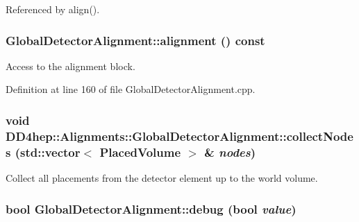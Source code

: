 Referenced by align().\hypertarget{class_d_d4hep_1_1_alignments_1_1_global_detector_alignment_a4c86dcdecf0985adee4f709f0db5a9e9}{
\subsubsection[{alignment}]{ GlobalDetectorAlignment::alignment () const}}
\label{class_d_d4hep_1_1_alignments_1_1_global_detector_alignment_a4c86dcdecf0985adee4f709f0db5a9e9}


Access to the alignment block. 

Definition at line 160 of file GlobalDetectorAlignment.cpp.\hypertarget{class_d_d4hep_1_1_alignments_1_1_global_detector_alignment_a05789b13a179780a57c759a573fdfe85}{
\subsubsection[{collectNodes}]{\setlength{\rightskip}{0pt plus 5cm}void DD4hep::Alignments::GlobalDetectorAlignment::collectNodes (std::vector$<$ PlacedVolume $>$ \& {\em nodes})}}
\label{class_d_d4hep_1_1_alignments_1_1_global_detector_alignment_a05789b13a179780a57c759a573fdfe85}


Collect all placements from the detector element up to the world volume. \hypertarget{class_d_d4hep_1_1_alignments_1_1_global_detector_alignment_af14b48c2d73add10f4b9dff410d6a5e0}{
\subsubsection[{debug}]{\setlength{\rightskip}{0pt plus 5cm}bool GlobalDetectorAlignment::debug (bool {\em value})}}
\label{class_d_d4hep_1_1_alignments_1_1_global_detector_alignment_af14b48c2d73add10f4b9dff410d6a5e0}


